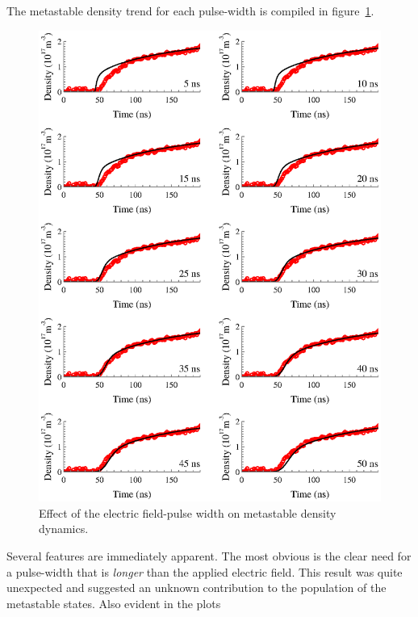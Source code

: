 The metastable density trend for each pulse-width is compiled in
figure~\ref{fig:widths}.
\begin{figure}
  \centering
  \includegraphics{./chapters/modeling/figures/widths.eps}
  \caption{Effect of the electric field-pulse width on metastable density
  dynamics.}
  \label{fig:widths}
\end{figure}
Several features are immediately apparent. The most obvious is the clear need
for a pulse-width that is \emph{longer} than the applied electric field. This
result was quite unexpected and suggested an unknown contribution to the
population of the metastable states. Also evident in the plots 



